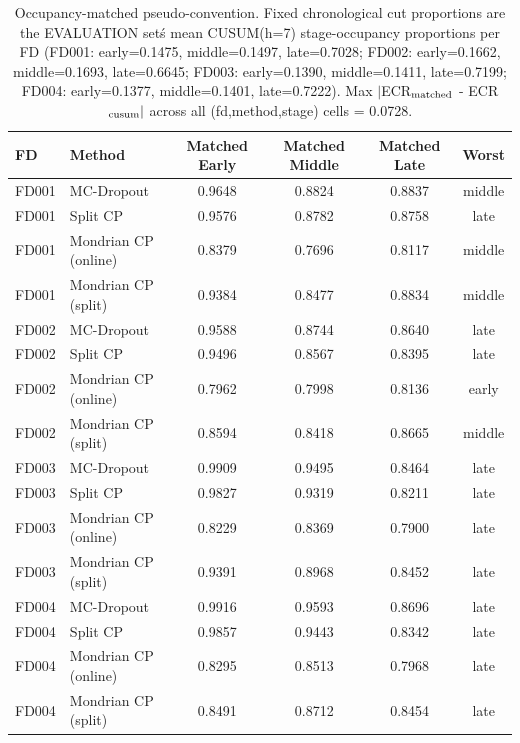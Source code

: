 \begin{table}[t]
\caption{Occupancy-matched pseudo-convention. Fixed chronological cut proportions are the EVALUATION set\'s mean CUSUM(h=7) stage-occupancy proportions per FD (FD001: early=0.1475, middle=0.1497, late=0.7028; FD002: early=0.1662, middle=0.1693, late=0.6645; FD003: early=0.1390, middle=0.1411, late=0.7199; FD004: early=0.1377, middle=0.1401, late=0.7222). Max $|$ECR$_{\rm matched}$ - ECR$_{\rm cusum}|$ across all (fd,method,stage) cells = 0.0728.}
\label{tab:matched-v2}
\centering
\small
\begin{tabular}{llcccc}
\toprule
FD & Method & Matched Early & Matched Middle & Matched Late & Worst \\
\midrule
FD001 & MC-Dropout & 0.9648 & 0.8824 & 0.8837 & middle \\
FD001 & Split CP & 0.9576 & 0.8782 & 0.8758 & late \\
FD001 & Mondrian CP (online) & 0.8379 & 0.7696 & 0.8117 & middle \\
FD001 & Mondrian CP (split) & 0.9384 & 0.8477 & 0.8834 & middle \\
FD002 & MC-Dropout & 0.9588 & 0.8744 & 0.8640 & late \\
FD002 & Split CP & 0.9496 & 0.8567 & 0.8395 & late \\
FD002 & Mondrian CP (online) & 0.7962 & 0.7998 & 0.8136 & early \\
FD002 & Mondrian CP (split) & 0.8594 & 0.8418 & 0.8665 & middle \\
FD003 & MC-Dropout & 0.9909 & 0.9495 & 0.8464 & late \\
FD003 & Split CP & 0.9827 & 0.9319 & 0.8211 & late \\
FD003 & Mondrian CP (online) & 0.8229 & 0.8369 & 0.7900 & late \\
FD003 & Mondrian CP (split) & 0.9391 & 0.8968 & 0.8452 & late \\
FD004 & MC-Dropout & 0.9916 & 0.9593 & 0.8696 & late \\
FD004 & Split CP & 0.9857 & 0.9443 & 0.8342 & late \\
FD004 & Mondrian CP (online) & 0.8295 & 0.8513 & 0.7968 & late \\
FD004 & Mondrian CP (split) & 0.8491 & 0.8712 & 0.8454 & late \\
\bottomrule
\end{tabular}
\end{table}
